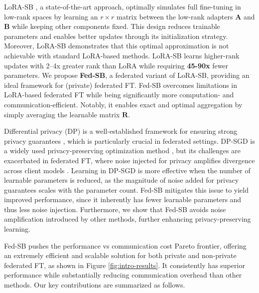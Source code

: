 LoRA-SB \citep{ponkshe2024initialization}, a state-of-the-art approach, optimally simulates full fine-tuning in low-rank spaces by learning an \( r \times r \) matrix between the low-rank adapters \( \mathbf{A} \) and \( \mathbf{B} \) while keeping other components fixed.  
This design reduces trainable parameters and enables better updates through its initialization strategy.  
Moreover, LoRA-SB demonstrates that this optimal approximation is not achievable with standard LoRA-based methods.
LoRA-SB learns higher-rank updates with 2–4x greater rank than LoRA while requiring \textbf{45-90x} fewer parameters.
We propose \textbf{Fed-SB}, a federated variant of LoRA-SB, providing an ideal framework for (private) federated FT. 
Fed-SB overcomes limitations in LoRA-based federated FT while being significantly more computation- and communication-efficient. 
Notably, it enables exact and optimal aggregation by simply averaging the learnable matrix \(\mathbf{R}\).

Differential privacy (DP) is a well-established framework for ensuring strong privacy guarantees \citep{dwork2006differential, dwork2014algorithmic}, which is particularly crucial in federated settings. 
DP-SGD is a widely used privacy-preserving optimization method \citep{dgsgd}, but its challenges are exacerbated in federated FT, where noise injected for privacy amplifies divergence across client models \citep{sun2024improving}. 
Learning in DP-SGD is more effective when the number of learnable parameters is reduced, as the magnitude of noise added for privacy guarantees scales with the parameter count. 
Fed-SB mitigates this issue to yield improved performance, since it inherently has fewer learnable parameters and thus less noise injection.
Furthermore, we show that Fed-SB avoids noise amplification introduced by other methods, further enhancing privacy-preserving learning.

Fed-SB pushes the performance vs communication cost Pareto frontier, offering an extremely efficient and scalable solution for both private and non-private federated FT, as shown in Figure \ref{fig:intro-results}. 
It consistently has superior performance while substantially reducing communication overhead than other methods. 
Our key contributions are summarized as follows.

